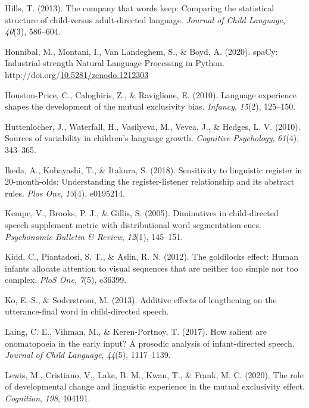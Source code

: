 \documentclass[10pt, letterpaper]{article}
\newenvironment{CSLReferences}%
  {}%
  {\par}
\begin{document}
\begin{CSLReferences}{1}{0}
\leavevmode\hypertarget{ref-hills2013company}{}%
Hills, T. (2013). The company that words keep: Comparing the statistical
structure of child-versus adult-directed language. \emph{Journal of
Child Language}, \emph{40}(3), 586--604.

\leavevmode\hypertarget{ref-honnibal2020spacy}{}%
Honnibal, M., Montani, I., Van Landeghem, S., \& Boyd, A. (2020).
{spaCy: Industrial-strength Natural Language Processing in Python}.
http://doi.org/\href{https://doi.org/10.5281/zenodo.1212303}{10.5281/zenodo.1212303}

\leavevmode\hypertarget{ref-houston2010language}{}%
Houston-Price, C., Caloghiris, Z., \& Raviglione, E. (2010). Language
experience shapes the development of the mutual exclusivity bias.
\emph{Infancy}, \emph{15}(2), 125--150.

\leavevmode\hypertarget{ref-huttenlocher2010sources}{}%
Huttenlocher, J., Waterfall, H., Vasilyeva, M., Vevea, J., \& Hedges, L.
V. (2010). Sources of variability in children's language growth.
\emph{Cognitive Psychology}, \emph{61}(4), 343--365.

\leavevmode\hypertarget{ref-ikeda2018sensitivity}{}%
Ikeda, A., Kobayashi, T., \& Itakura, S. (2018). Sensitivity to
linguistic register in 20-month-olds: Understanding the
register-listener relationship and its abstract rules. \emph{Plos One},
\emph{13}(4), e0195214.

\leavevmode\hypertarget{ref-kempe2005diminutives}{}%
Kempe, V., Brooks, P. J., \& Gillis, S. (2005). Diminutives in
child-directed speech supplement metric with distributional word
segmentation cues. \emph{Psychonomic Bulletin \& Review}, \emph{12}(1),
145--151.

\leavevmode\hypertarget{ref-kidd2012goldilocks}{}%
Kidd, C., Piantadosi, S. T., \& Aslin, R. N. (2012). The goldilocks
effect: Human infants allocate attention to visual sequences that are
neither too simple nor too complex. \emph{PloS One}, \emph{7}(5),
e36399.

\leavevmode\hypertarget{ref-ko2013additive}{}%
Ko, E.-S., \& Soderstrom, M. (2013). Additive effects of lengthening on
the utterance-final word in child-directed speech.

\leavevmode\hypertarget{ref-laing2017salient}{}%
Laing, C. E., Vihman, M., \& Keren-Portnoy, T. (2017). How salient are
onomatopoeia in the early input? A prosodic analysis of infant-directed
speech. \emph{Journal of Child Language}, \emph{44}(5), 1117--1139.

\leavevmode\hypertarget{ref-lewis2020role}{}%
Lewis, M., Cristiano, V., Lake, B. M., Kwan, T., \& Frank, M. C. (2020).
The role of developmental change and linguistic experience in the mutual
exclusivity effect. \emph{Cognition}, \emph{198}, 104191.


\end{CSLReferences}
\end{document}
